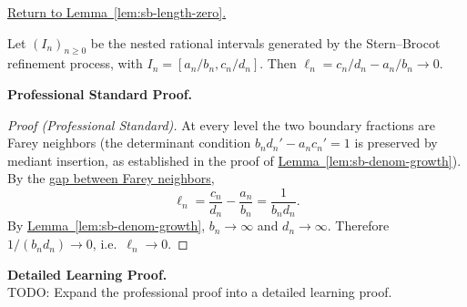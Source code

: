 
\newpage
{}
\label{prf:sb-length-zero}

\begin{remark*}[Return]
\hyperref[lem:sb-length-zero]{Return to Lemma~\ref*{lem:sb-length-zero}.}
\end{remark*}

\begin{theorem*}
Let $(I_n)_{n \geq 0}$ be the nested rational intervals generated by the
Stern--Brocot refinement process, with $I_n = [a_n/b_n, c_n/d_n]$.
Then $\ell_n = c_n/d_n - a_n/b_n \to 0$.
\end{theorem*}

\textbf{Professional Standard Proof.}~\\
\begin{proof}
[Proof (Professional Standard)]
At every level the two boundary fractions are Farey neighbors (the
determinant condition $b_n d_n' - a_n c_n' = 1$ is preserved by mediant
insertion, as established in the proof of
\hyperref[lem:sb-denom-growth]{Lemma~\ref*{lem:sb-denom-growth}}).
By the \hyperref[thm:farey-gap]{gap between Farey neighbors},
\[
\ell_n = \frac{c_n}{d_n} - \frac{a_n}{b_n} = \frac{1}{b_n d_n}.
\]
By \hyperref[lem:sb-denom-growth]{Lemma~\ref*{lem:sb-denom-growth}},
$b_n \to \infty$ and $d_n \to \infty$.  Therefore $1/(b_n d_n) \to 0$,
i.e.\ $\ell_n \to 0$.
\end{proof}

\textbf{Detailed Learning Proof.}~\\
TODO: Expand the professional proof into a detailed learning proof.



